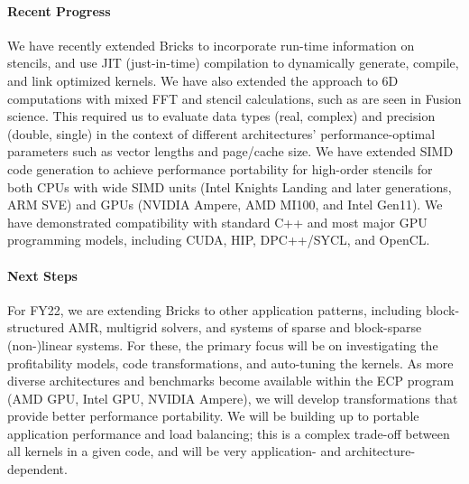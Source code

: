 \paragraph{Recent Progress}
We have recently extended Bricks to 
  incorporate run-time information on stencils, and use JIT (just-in-time) compilation to
  dynamically generate, compile, and link optimized kernels.
We have also extended the approach to 6D computations with mixed FFT and stencil
  calculations, such as are seen in Fusion science.
This required us to evaluate data types (real, complex) and precision (double, single) in the 
  context of different architectures’ performance-optimal parameters such as vector lengths
  and page/cache size.
We have extended SIMD code generation to achieve performance portability
  for high-order stencils for both CPUs with wide SIMD units (Intel Knights Landing and later 
  generations, ARM SVE) and GPUs (NVIDIA Ampere, AMD MI100, and Intel Gen11).  
We have demonstrated compatibility with standard C++ and most major GPU
  programming models, including CUDA, HIP, DPC++/SYCL, and OpenCL.

\paragraph{Next Steps}
For FY22, we are extending Bricks to other
  application patterns, including block-structured AMR, multigrid solvers,
  and systems of sparse and block-sparse (non-)linear systems.
For these, the primary focus will be on investigating the profitability
  models, code transformations, and auto-tuning the kernels.
As more diverse architectures and benchmarks become available within 
  the ECP program (AMD GPU, Intel GPU, NVIDIA Ampere), we will develop 
  transformations that provide better performance portability.
We will be building up to portable application performance 
  and load balancing; this is a complex trade-off between all kernels in
  a given code, and will be very application- and architecture-dependent.

